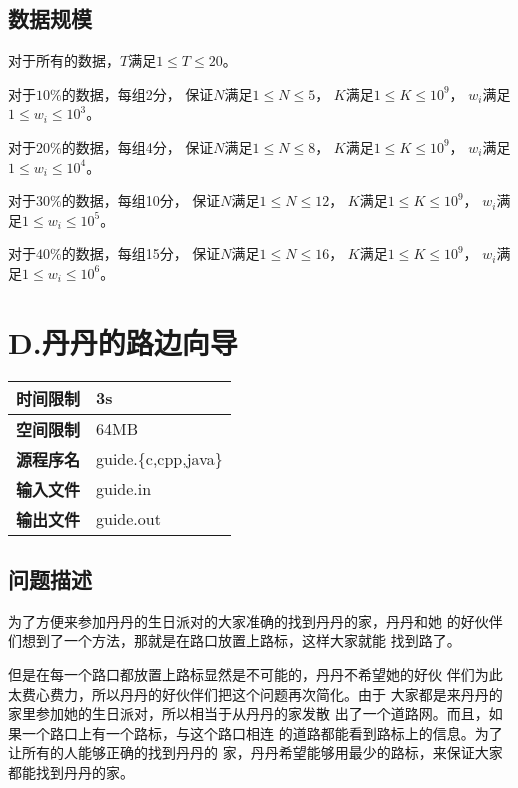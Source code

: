 \documentclass{article}
\begin{document}
\subsection*{数据规模}
对于所有的数据，$T$满足$1 \leq T \leq 20$。

对于$10\%$的数据，每组2分，
保证$N$满足$1 \leq N \leq 5$，
$K$满足$1 \leq K \leq 10^{9}$，
$w_i$满足$1 \leq w_i \leq 10^{3}$。

对于$20\%$的数据，每组4分，
保证$N$满足$1 \leq N \leq 8$，
$K$满足$1 \leq K \leq 10^{9}$，
$w_i$满足$1 \leq w_i \leq 10^{4}$。

对于$30\%$的数据，每组10分，
保证$N$满足$1 \leq N \leq 12$，
$K$满足$1 \leq K \leq 10^{9}$，
$w_i$满足$1 \leq w_i \leq 10^{5}$。

对于$40\%$的数据，每组15分，
保证$N$满足$1 \leq N \leq 16$，
$K$满足$1 \leq K \leq 10^{9}$，
$w_i$满足$1 \leq w_i \leq 10^{6}$。

\clearpage

\section*{D.丹丹的路边向导}
\begin{longtable}{|c|l|}
 \hline \bfseries{时间限制} & 3s \\
 \hline \bfseries{空间限制} & 64MB \\
 \hline \bfseries{源程序名} & guide.\{c,cpp,java\} \\
 \hline \bfseries{输入文件} & guide.in \\
 \hline \bfseries{输出文件} & guide.out \\
 \hline 
\end{longtable}

\subsection*{问题描述}
为了方便来参加丹丹的生日派对的大家准确的找到丹丹的家，丹丹和她
的好伙伴们想到了一个方法，那就是在路口放置上路标，这样大家就能
找到路了。

但是在每一个路口都放置上路标显然是不可能的，丹丹不希望她的好伙
伴们为此太费心费力，所以丹丹的好伙伴们把这个问题再次简化。由于
大家都是来丹丹的家里参加她的生日派对，所以相当于从丹丹的家发散
出了一个道路网。而且，如果一个路口上有一个路标，与这个路口相连
的道路都能看到路标上的信息。为了让所有的人能够正确的找到丹丹的
家，丹丹希望能够用最少的路标，来保证大家都能找到丹丹的家。
\end{document}
